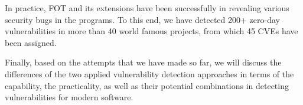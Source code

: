 In practice, FOT and its extensions have been successfully in revealing various security bugs in the programs. To this end, we have detected 200+ zero-day vulnerabilities in more than 40 world famous projects, from which 45 CVEs have been assigned.

Finally, based on the attempts that we have made so far, we will discuss the differences of the two applied vulnerability detection approaches in terms of the capability, the practicality, as well as their potential combinations in detecting vulnerabilities for modern software.






